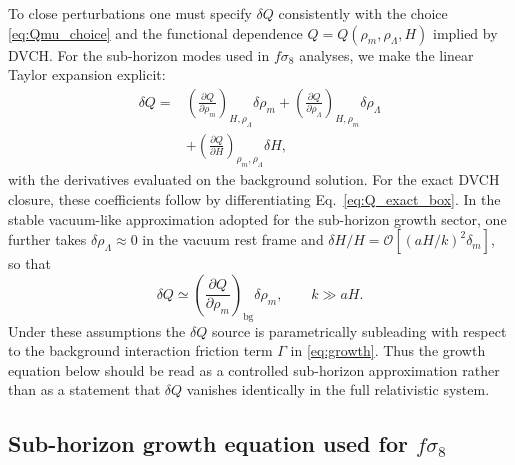 \documentclass[pdflatex,sn-mathphys-num]{sn-jnl}%
\begin{document}
To close perturbations one must specify $\delta Q$ consistently with the
choice \eqref{eq:Qmu_choice} and the functional dependence $Q=Q(\rho_m,\rho_\Lambda,H)$
implied by DVCH. For the sub-horizon modes used in $f\sigma_8$ analyses,
we make the linear Taylor expansion explicit:
\begin{equation}
\begin{aligned}
\delta Q
=&\left(\frac{\partial Q}{\partial \rho_m}\right)_{H,\rho_\Lambda}\!\delta\rho_m
+ \left(\frac{\partial Q}{\partial \rho_\Lambda}\right)_{H,\rho_m}\!\delta\rho_\Lambda \\
&+ \left(\frac{\partial Q}{\partial H}\right)_{\rho_m,\rho_\Lambda}\!\delta H,
\end{aligned}
\label{eq:deltaQ_taylor}
\end{equation}
with the derivatives evaluated on the background solution. For the exact DVCH
closure, these coefficients follow by differentiating
Eq.~\eqref{eq:Q_exact_box}. In the stable vacuum-like approximation adopted
for the sub-horizon growth sector, one further takes
$\delta\rho_\Lambda\approx 0$ in the vacuum rest frame and
$\delta H/H=\mathcal{O}[(aH/k)^2\delta_m]$, so that
\begin{equation}
\delta Q \simeq
\left(\frac{\partial Q}{\partial \rho_m}\right)_{\!\mathrm{bg}}\delta\rho_m,
\qquad k\gg aH.
\label{eq:deltaQ_subh}
\end{equation}
Under these assumptions the $\delta Q$ source is parametrically subleading
with respect to the background interaction friction term $\Gamma$ in
\eqref{eq:growth}. Thus the growth equation below should be read as a
controlled sub-horizon approximation rather than as a statement that
$\delta Q$ vanishes identically in the full relativistic system.

\subsection{Sub-horizon growth equation used for \texorpdfstring{$f\sigma_8$}{f sigma 8}}
\label{subsec:growth}
\end{document}
